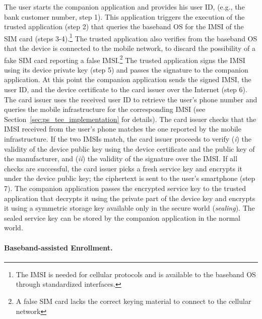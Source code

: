 The user starts the companion application and provides his user ID, (e.g., the
bank customer number, step 1). This application triggers the execution of the
trusted application (step 2) that queries the baseband OS for the IMSI of the
SIM card (steps 3-4).\footnote{The IMSI is needed for cellular protocols and is
available to the baseband OS through standardized interfaces.} The trusted
application also verifies from the baseband OS that the device is connected to
the mobile network, to discard the possibility of a fake SIM card reporting a
false IMSI.\footnote{A false SIM card lacks the correct keying material to
connect to the cellular network} The trusted application signs the IMSI using
its device private key (step 5) and passes the signature to the companion
application. At this point the companion application sends the signed IMSI, the
user ID, and the device certificate to the card issuer over the Internet (step
6). The card issuer uses the received user ID to retrieve the user's phone
number and queries the mobile infrastructure for the corresponding IMSI (see
Section~\ref{sec:ps_tee_implementation} for details). The card issuer checks
that the IMSI received from the user's phone matches the one reported by the
mobile infrastructure. If the two IMSIs match, the card issuer proceeds to
verify (\emph{i}) the validity of the device public key using the device certificate
and the public key of the manufacturer, and (\emph{ii}) the validity of the signature
over the IMSI. If all checks are successful, the card issuer picks a fresh
service key and encrypts it under the device public key; the ciphertext is sent
to the user's smartphone (step 7). The companion application passes the
encrypted service key to the trusted application that decrypts it using the
private part of the device key and encrypts it using a symmetric storage key
available only in the secure world (\emph{sealing}). The sealed service key can
be stored by the companion application in the normal world.

\paragraph{Baseband-assisted Enrollment.}

